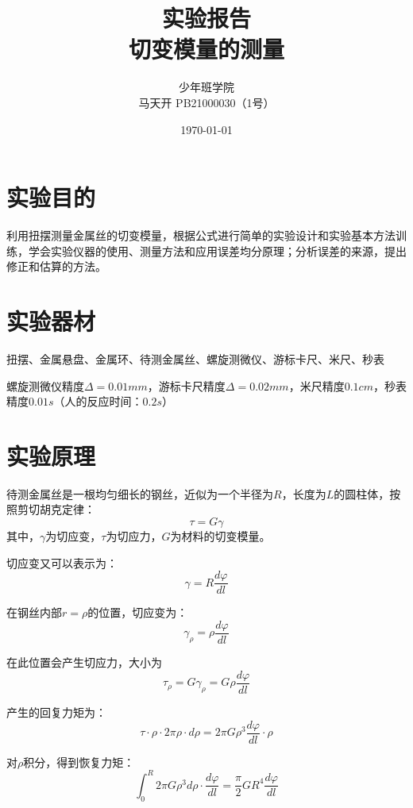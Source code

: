 \documentclass[a4paper]{ltxdoc}
\title{实验报告\\切变模量的测量}
\author{少年班学院\\马天开 PB21000030（1号）}
\date{\today}
\begin{document}
\begin{multicols}{2}
  \maketitle
  \section{实验目的}
  利用扭摆测量金属丝的切变模量，根据公式进行简单的实验设计和实验基本方法训练，学会实验仪器的使用、测量方法和应用误差均分原理；分析误差的来源，提出修正和估算的方法。
  \section{实验器材}
  扭摆、金属悬盘、金属环、待测金属丝、螺旋测微仪、游标卡尺、米尺、秒表

  螺旋测微仪精度$\Delta = 0.01 mm$，游标卡尺精度$\Delta = 0.02mm$，米尺精度$0.1cm$，秒表精度$0.01s$（人的反应时间：$0.2s$）
  \section{实验原理}
  待测金属丝是一根均匀细长的钢丝，近似为一个半径为$R$，长度为$L$的圆柱体，按照剪切胡克定律：
  \begin{equation}
    \tau = G \gamma
  \end{equation}
  其中，$\gamma$为切应变，$\tau$为切应力，$G$为材料的切变模量。

  切应变又可以表示为：
  \begin{equation}
    \gamma = R \dfrac{d\varphi}{dl}
  \end{equation}

  在钢丝内部$r=\rho$的位置，切应变为：
  \begin{equation}
    \gamma_\rho = \rho \dfrac{d\varphi}{dl}
  \end{equation}

  在此位置会产生切应力，大小为
  \begin{equation}
    \tau_\rho = G \gamma_\rho = G\rho \dfrac{d\varphi}{dl}
  \end{equation}

  产生的回复力矩为：
  \begin{equation}
    \tau \cdot \rho \cdot 2 \pi \rho \cdot d\rho = 2\pi G \rho ^3\dfrac{d\varphi}{dl}\cdot \rho
  \end{equation}

  对$\rho$积分，得到恢复力矩：
  \begin{equation}
    \int _0 ^R 2\pi G \rho^3 d\rho \cdot \dfrac{d\varphi}{dl} = \dfrac{\pi}{2} G R ^4 \dfrac{d\varphi}{dl}
  \end{equation}


\end{multicols}
\end{document}
